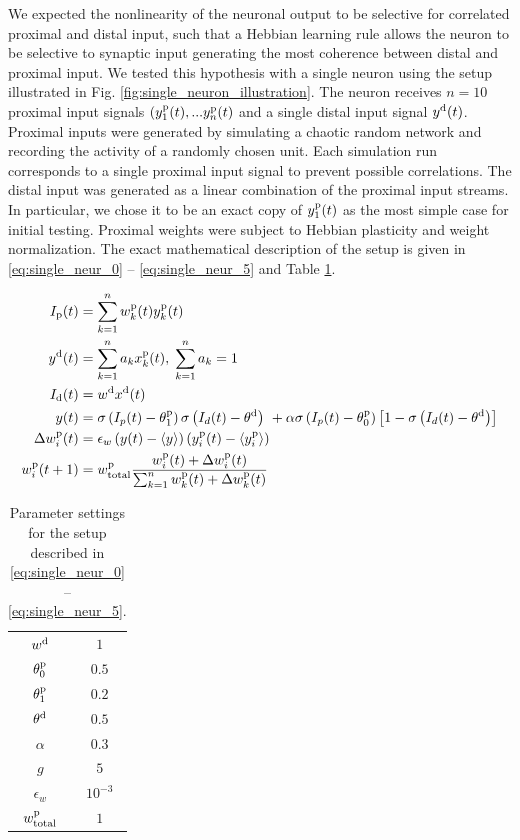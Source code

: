 \documentclass[10pt,a4paper]{article}
\begin{document}
We expected the nonlinearity of the neuronal output to be selective for correlated proximal and distal input, such that a Hebbian learning rule allows the neuron to be selective to synaptic input generating the most coherence between distal and proximal input. We tested this hypothesis with a single neuron using the setup illustrated in Fig. \ref{fig:single_neuron_illustration}. The neuron receives $n=10$ proximal input signals $(y^{\rm p}_1(t),...y^{\rm p}_n(t)$ and a single distal input signal $y^{\rm d}(t)$. Proximal inputs were generated by simulating a chaotic random network and recording the activity of a randomly chosen unit. Each simulation run corresponds to a single proximal input signal to prevent possible correlations. The distal input was generated as a linear combination of the proximal input streams. In particular, we chose it to be an exact copy of $y^{\rm p}_1(t)$ as the most simple case for initial testing. Proximal weights were subject to Hebbian plasticity and weight normalization. The exact mathematical description of the setup is given in \eqref{eq:single_neur_0} -- \eqref{eq:single_neur_5} and Table \ref{tab:single_neuron_parameters}.

\begin{align}
I_{\rm p} (t) &= \sum_{k=1}^n w^{\rm p}_{k} (t) y^{\rm p}_{k} (t) \label{eq:single_neur_0} \\
y^{\rm d} (t) &= \sum_{k=1}^n a_k x^{\rm p}_{k} (t), \; \sum_{k=1}^n a_k = 1 \label{eq:single_neur_1} \\
I_{\rm d} (t) &= w^{\rm d} x^{\rm d} (t) \label{eq:single_neur_2} \\
y(t) &= \sigma\left(I_p(t)-\theta^{\rm p}_{1}\right) \sigma\left(I_d(t)-\theta^{\rm d}\right)\ +\alpha\sigma\left(I_p(t)-\theta^{\rm p}_{0}\right)\left[ 1 - \sigma\left(I_d(t)-\theta^{\rm d}\right)\right] \label{eq:single_neur_3} \\
\Delta w^{\rm p}_{i} (t) &= \epsilon_w  \left(y(t)-\langle y \rangle\right)\left(y^{\rm p}_{i}(t)-\langle y^{\rm p}_{i} \rangle \right) \label{eq:single_neur_4} \\
w^{\rm p}_{i}(t+1) &= w^{\rm p}_{\rm total} \frac{w^{\rm p}_{i}(t) + \Delta w^{\rm p}_{i}(t)}{\sum_{k=1}^n w^{\rm p}_{k}(t) + \Delta w^{\rm p}_{k}(t)} \label{eq:single_neur_5}
\end{align}

\begin{table}
\centering
\caption{Parameter settings for the setup described in \eqref{eq:single_neur_0} -- \eqref{eq:single_neur_5}.}
\begin{tabular}{|c|c|}
\hline
$w^{\rm d}$ & $1$ \\
$\theta^{\rm p}_{0}$ & $0.5$ \\
$\theta^{\rm p}_{1}$ & $0.2$ \\
$\theta^{\rm d}$ & $0.5$ \\
$\alpha$ & $0.3$ \\
$g$ & $5$ \\
$\epsilon_w$ & $10^{-3}$ \\
$w^{\rm p}_{\rm total}$ & $1$ \\
\hline
\end{tabular}
\label{tab:single_neuron_parameters}
\end{table}
\end{document}
